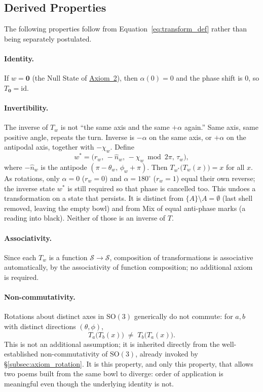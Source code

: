 \documentclass[12pt, a4paper]{article}
\begin{document}
\subsection{Derived Properties}
\label{subsec:transform_properties}
The following properties follow from Equation~\eqref{eq:transform_def}
rather than being separately postulated.

\paragraph{Identity.} If $w = \mathbf{0}$ (the Null State of
\hyperref[subsec:axiom_null]{Axiom~2}), then $\alpha(0) = 0$ and the phase
shift is $0$, so $T_{\mathbf{0}} = \mathrm{id}$.

\paragraph{Invertibility.}
The inverse of $T_w$ is not ``the same axis and the same $+\alpha$ again.'' Same axis, same positive angle, repeats the turn. Inverse is $-\alpha$ on the same axis, or $+\alpha$ on the antipodal axis, together with $-\chi_w$. Define
\begin{equation}
    w^{*} = \bigl(r_w,\,-\hat n_w,\,-\chi_w \bmod 2\pi,\,\tau_w\bigr),
\end{equation}
where $-\hat n_w$ is the antipode $(\pi-\theta_w,\,\phi_w+\pi)$.
Then $T_{w^{*}}\!\big(T_w(x)\big) = x$ for all $x$. As rotations, only $\alpha=0$ ($r_w=0$) and $\alpha=180^\circ$ ($r_w=1$) equal their own reverse; the inverse state $w^{*}$ is still required so that phase is cancelled too. This undoes a transformation on a state that persists. It is distinct from $\{A\}\setminus A=\emptyset$ (last shell removed, leaving the empty bowl) and from Mix of equal anti-phase marks (a reading into black). Neither of those is an inverse of $T$.

\paragraph{Associativity.} Since each $T_w$ is a function
$\mathcal{S} \to \mathcal{S}$, composition of transformations is
associative automatically, by the associativity of function
composition; no additional axiom is required.

\paragraph{Non-commutativity.} Rotations about distinct axes in
$\mathrm{SO}(3)$ generically do not commute: for $a, b$ with distinct
directions $(\theta,\phi)$,
\begin{equation}
    T_a\big(T_b(x)\big) \;\neq\; T_b\big(T_a(x)\big).
    \label{eq:noncommute}
\end{equation}
This is not an additional assumption; it is inherited directly from
the well-established non-commutativity of $\mathrm{SO}(3)$, already
invoked by \S\ref{subsec:axiom_rotation}. It is this property,
and only this property, that allows two poems built from the same
bowl to diverge: order of application is meaningful even
though the underlying identity is not.
\end{document}
